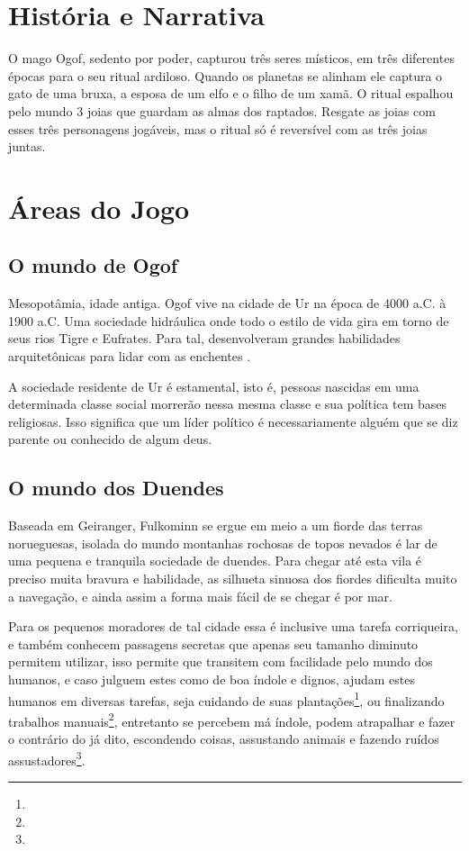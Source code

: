 
\section{História e Narrativa}

O mago Ogof, sedento por poder, capturou três seres místicos, em três diferentes épocas para o seu ritual ardiloso. Quando os planetas se alinham ele captura o gato de uma bruxa, a esposa de um elfo e o filho de um xamã. O ritual espalhou pelo mundo 3 joias que guardam as almas dos raptados. Resgate as joias com esses três personagens jogáveis, mas o ritual só é reversível com as três joias juntas.

\section{Áreas do Jogo}

\subsection{O mundo de Ogof}
Mesopotâmia, idade antiga. Ogof vive na cidade de Ur na época de 4000 a.C. à 1900 a.C. Uma sociedade hidráulica onde todo o estilo de vida gira em torno de seus rios Tigre e Eufrates. Para tal, desenvolveram grandes habilidades arquitetônicas para lidar com as enchentes .

A sociedade residente de Ur é estamental, isto é, pessoas nascidas em uma determinada classe social morrerão nessa mesma classe e sua política tem bases religiosas. Isso significa que um líder político é necessariamente alguém que se diz parente ou conhecido de algum deus.

\subsection{O mundo dos Duendes}
Baseada em Geiranger, Fulkominn se ergue em meio a um fiorde das terras norueguesas, isolada do mundo montanhas rochosas de topos nevados é lar de uma pequena e tranquila sociedade de duendes. Para chegar até esta vila é preciso muita bravura e habilidade, as silhueta sinuosa dos fiordes dificulta muito a navegação, e ainda assim a forma mais fácil de se chegar é por mar. 

Para os pequenos moradores de tal cidade essa é inclusive uma tarefa corriqueira, e também conhecem passagens secretas que apenas seu tamanho diminuto permitem utilizar, isso permite que transitem com facilidade pelo mundo dos humanos, e caso julguem estes como de boa índole e dignos, ajudam estes humanos em diversas tarefas, seja cuidando de suas plantações\footnote{}, ou finalizando trabalhos manuais\footnote{}, entretanto se percebem má índole, podem atrapalhar e fazer o contrário do já dito, escondendo coisas, assustando animais e fazendo ruídos assustadores\footnote{}.

